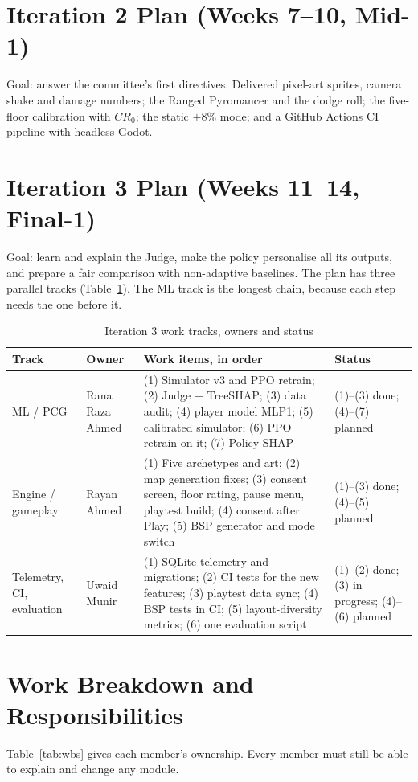 \section{Iteration 2 Plan (Weeks 7--10, Mid-1)}
Goal: answer the committee's first directives. Delivered pixel-art sprites, camera shake and damage numbers; the Ranged Pyromancer and the dodge roll; the five-floor calibration with $CR_0$; the static $+8\%$ mode; and a GitHub Actions CI pipeline with headless Godot.

\section{Iteration 3 Plan (Weeks 11--14, Final-1)}
\label{sec:iter3_plan}
Goal: learn and explain the Judge, make the policy personalise all its outputs, and prepare a fair comparison with non-adaptive baselines. The plan has three parallel tracks (Table~\ref{tab:iter3_tracks}). The ML track is the longest chain, because each step needs the one before it.

\begin{table}[!htbp]
\centering
\caption{Iteration 3 work tracks, owners and status}
\label{tab:iter3_tracks}
\scriptsize
\begin{tabular}{p{}p{}p{}p{}}
\toprule
\textbf{Track} & \textbf{Owner} & \textbf{Work items, in order} & \textbf{Status} \\
\midrule
ML / PCG & Rana Raza Ahmed & (1) Simulator v3 and PPO retrain; (2) Judge + TreeSHAP; (3) data audit; (4) player model MLP1; (5) calibrated simulator; (6) PPO retrain on it; (7) Policy SHAP & (1)--(3) done; (4)--(7) planned \\
\midrule
Engine / gameplay & Rayan Ahmed & (1) Five archetypes and art; (2) map generation fixes; (3) consent screen, floor rating, pause menu, playtest build; (4) consent after Play; (5) BSP generator and mode switch & (1)--(3) done; (4)--(5) planned \\
\midrule
Telemetry, CI, evaluation & Uwaid Munir & (1) SQLite telemetry and migrations; (2) CI tests for the new features; (3) playtest data sync; (4) BSP tests in CI; (5) layout-diversity metrics; (6) one evaluation script & (1)--(2) done; (3) in progress; (4)--(6) planned \\
\bottomrule
\end{tabular}
\end{table}

\section{Work Breakdown and Responsibilities}
Table~\ref{tab:wbs} gives each member's ownership. Every member must still be able to explain and change any module.

